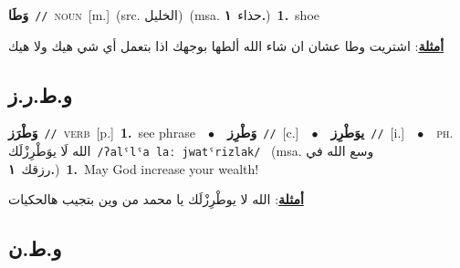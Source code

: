 \documentclass[10pt,a4paper,twoside]{article} %
\begin{document}
\begin{multicols}{2}
{\setlength\topsep{0pt}\textbf{\foreignlanguage{arabic}{وَطَا}}\ {\color{gray}\texttt{//}\color{black}}\ \textsc{noun}\ [m.]\ (src. \color{gray}\foreignlanguage{arabic}{الخليل}\color{black})\ \color{gray}(msa. \foreignlanguage{arabic}{حذاء}~\foreignlanguage{arabic}{\textbf{١.}})\color{black}\ \textbf{1.}~shoe\  \begin{flushright}\color{gray}\foreignlanguage{arabic}{\textbf{\underline{\foreignlanguage{arabic}{أمثلة}}}: اشتريت وطا عشان ان شاء الله ألطها بوجهك اذا بتعمل أي شي هيك ولا هيك}\end{flushright}\color{black}} \vspace{2mm}

\vspace{-3mm}
\subsection*{\color{blue}\foreignlanguage{arabic}{و.ط.ر.ز}\color{blue}{}} 

{\setlength\topsep{0pt}\textbf{\foreignlanguage{arabic}{وَطْرَز}}\ {\color{gray}\texttt{//}\color{black}}\ \textsc{verb}\ [p.]\ \textbf{1.}~see phrase\ \ $\bullet$\ \ \setlength\topsep{0pt}\textbf{\foreignlanguage{arabic}{وَطْرِز}}\ {\color{gray}\texttt{//}\color{black}}\ [c.]\ \ $\bullet$\ \ \setlength\topsep{0pt}\textbf{\foreignlanguage{arabic}{يوَطْرِز}}\ {\color{gray}\texttt{//}\color{black}}\ [i.]\ \ $\bullet$\ \ \textsc{ph.} \color{gray} \foreignlanguage{arabic}{الله لَا يوَطْرِزْلَك}\color{black}\ {\color{gray}\texttt{/{\sffamily ʔalˤlˤa laː jwatˤrizlak}/}\color{black}}\ \color{gray} (msa. \foreignlanguage{arabic}{وسع الله في رزقك}~\foreignlanguage{arabic}{\textbf{١.}})\color{black}\ \textbf{1.}~May God increase your wealth!\  \begin{flushright}\color{gray}\foreignlanguage{arabic}{\textbf{\underline{\foreignlanguage{arabic}{أمثلة}}}: الله لا يوطْرِزْلَك يا محمد من وين بتجيب هالحكيات}\end{flushright}\color{black}} \vspace{2mm}

\vspace{-3mm}
\subsection*{\color{blue}\foreignlanguage{arabic}{و.ط.ن}\color{blue}{}} 


\end{multicols}
\end{document}
